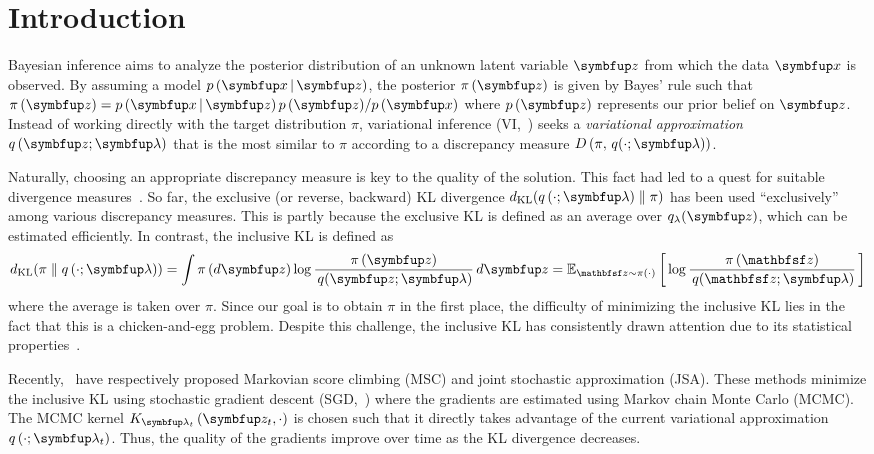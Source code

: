 
\section{Introduction}
Bayesian inference aims to analyze the posterior distribution of an unknown latent variable \(\vz\) from which the data \(\vx\) is observed.
By assuming a model \(p\,(\vx\,|\,\vz)\), the posterior \(\pi\,(\vz)\) is given by Bayes' rule such that \(\pi\,(\vz) = {p\,(\vx\,|\,\vz)\,p\,(\vz)}/{p\,(\vx)}\) where \(p\,(\vz)\) represents our prior belief on \(\vz\).
Instead of working directly with the target distribution \(\pi\), variational inference (VI,~\citealt{blei_variational_2017}) seeks a \textit{variational approximation} \(q\,(\vz; \vlambda)\) that is the most similar to \(\pi\) according to a discrepancy measure \(D\,(\pi,\, q(\cdot; \vlambda))\).

Naturally, choosing an appropriate discrepancy measure is key to the quality of the solution.
This fact had led to a quest for suitable divergence measures~\citep{pmlr-v37-salimans15, NIPS2016_7750ca35, NIPS2017_35464c84, NEURIPS2018_1cd138d0, pmlr-v97-ruiz19a}.
So far, the exclusive (or reverse, backward)  KL divergence \(\DKL{q\left(\cdot; \vlambda\right)}{\pi}\) has been used ``exclusively'' among various discrepancy measures.
This is partly because the exclusive KL is defined as an average over \(q_{\lambda}(\vz)\), which can be estimated efficiently.
In contrast, the inclusive KL is defined as
%
{%
\vspace{-0.05in}
\begin{align*}
  \DKL{\pi}{q\left(\cdot; \vlambda\right)}
  = \int \pi\,(d\vz) \log \frac{\pi\left(\vz\right)}{\,q(\vz; \vlambda)} \,d\vz
  = \Esub{\rvvz \sim \pi\left(\cdot\right)}{\log \frac{\pi\left(\rvvz\right)}{\,q(\rvvz; \vlambda)} } %
\end{align*}
}%
%
where the average is taken over \(\pi\).
Since our goal is to obtain \(\pi\) in the first place, the difficulty of minimizing the inclusive KL lies in the fact that this is a chicken-and-egg problem.
Despite this challenge, the inclusive KL has consistently drawn attention due to its statistical properties~\citep{minka2005divergence, mackay_local_2001}.

Recently,~\citet{NEURIPS2020_b2070693,pmlr-v124-ou20a} have respectively proposed Markovian score climbing (MSC) and joint stochastic approximation (JSA).
These methods minimize the inclusive KL using stochastic gradient descent (SGD,~\citealt{robbins_stochastic_1951}) where the gradients are estimated using Markov chain Monte Carlo (MCMC).
The MCMC kernel \(K_{\vlambda_t}\left(\vz_t, \cdot\right)\) is chosen such that it directly takes advantage of the current variational approximation \(q\left(\cdot; \vlambda_t\right)\).
Thus, the quality of the gradients improve over time as the KL divergence decreases.

